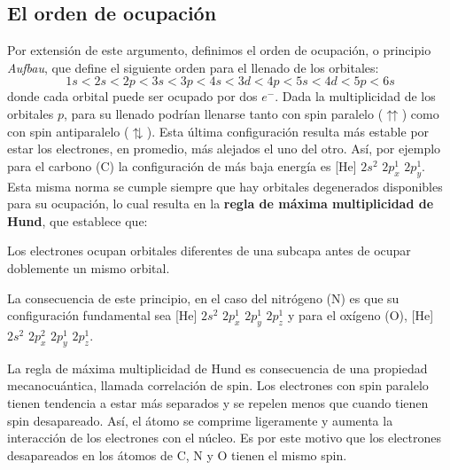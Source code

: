 \subsection{El orden de ocupación}
Por extensión de este argumento, definimos el orden de ocupación,
o principio \textit{Aufbau}, que define el siguiente orden para el 
llenado de los orbitales:
\begin{equation*}
    1s < 2s < 2p < 3s<  3p <4s < 3d < 4p < 5s < 4d < 5p < 6s
\end{equation*}
donde cada orbital puede ser ocupado por dos $e^{-}$. 
Dada la multiplicidad de los orbitales $p$, para su llenado podrían
llenarse tanto con spin paralelo ($\upuparrows$) como con spin antiparalelo 
($\updownarrows$). Esta última configuración resulta más estable por estar
los electrones, en promedio, más alejados el uno del otro.
Así, por ejemplo para el carbono (C) la configuración de más baja energía 
es [He] $2s^2$ $2p_x^1$ $2p_y^1$. Esta misma norma se cumple 
siempre que hay orbitales degenerados disponibles para su ocupación,
lo cual resulta en la \textbf{regla de máxima multiplicidad de Hund},
que establece que:
\begin{displayquote}
Los electrones ocupan orbitales diferentes de una subcapa antes 
de ocupar doblemente un mismo orbital.
\end{displayquote}
La consecuencia de este principio, en el caso del nitrógeno (N) es
que su configuración fundamental sea [He] $2s^2$ $2p_x^1$ $2p_y^1$ $2p_z^1$
y para el oxígeno (O), [He] $2s^2$ $2p_x^2$ $2p_y^1$ $2p_z^1$.

La regla de máxima multiplicidad de Hund es consecuencia de una
propiedad mecanocuántica, llamada correlación de spin. Los electrones
con spin paralelo tienen tendencia a estar más separados y se repelen
menos que cuando tienen spin desapareado. Así, el átomo se comprime
ligeramente y aumenta la interacción de los electrones con el núcleo.
Es por este motivo que los electrones desapareados en los átomos de C,
N y O tienen el mismo spin.